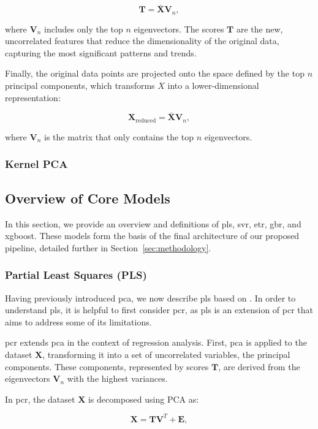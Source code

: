 $$
\mathbf{T} = \mathbf{\bar{X}} \mathbf{V}_n,
$$

where $\mathbf{V}_n$ includes only the top $n$ eigenvectors.
The scores $\mathbf{T}$ are the new, uncorrelated features that reduce the dimensionality of the original data, capturing the most significant patterns and trends.

Finally, the original data points are projected onto the space defined by the top $n$ principal components, which transforms $X$ into a lower-dimensional representation:

$$
\mathbf{X}_{\text{reduced}} = \mathbf{\bar{X}} \mathbf{V}_n,
$$

where $\mathbf{V}_n$ is the matrix that only contains the top $n$ eigenvectors.

\subsubsection{Kernel PCA}

\subsection{Overview of Core Models}
In this section, we provide an overview and definitions of \gls{pls}, \gls{svr}, \gls{etr}, \gls{gbr}, and \gls{xgboost}.
These models form the basis of the final architecture of our proposed pipeline, detailed further in Section~\ref{sec:methodology}.

\subsubsection{Partial Least Squares (PLS)}
Having previously introduced \gls{pca}, we now describe \gls{pls} based on \citet{James2023AnIS}.
In order to understand \gls{pls}, it is helpful to first consider \gls{pcr}, as \gls{pls} is an extension of \gls{pcr} that aims to address some of its limitations.

\gls{pcr} extends \gls{pca} in the context of regression analysis.
First, \gls{pca} is applied to the dataset $\mathbf{X}$, transforming it into a set of uncorrelated variables, the principal components.
These components, represented by scores $\mathbf{T}$, are derived from the eigenvectors $\mathbf{V}_n$ with the highest variances.

In \gls{pcr}, the dataset $\mathbf{X}$ is decomposed using PCA as:

$$
\mathbf{X} = \mathbf{TV}^T + \mathbf{E},
$$

